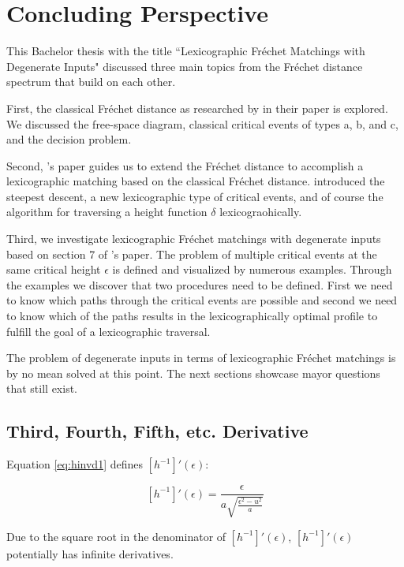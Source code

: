 \section{Concluding Perspective}
	This Bachelor thesis with the title ``Lexicographic Fréchet Matchings with Degenerate Inputs" discussed three main topics from the Fréchet distance spectrum that build on each other.
	
	First, the classical Fréchet distance as researched by \citeauthor{altgodau} in their \citeyear{altgodau} paper \cite{altgodau} is explored. We discussed the free-space diagram, classical critical events of types a, b, and c, and the decision problem.
	
	Second, \citeauthor{rotelex}'s \citeyear{rotelex} paper \cite{rotelex} guides us to extend the Fréchet distance to accomplish a lexicographic matching based on the classical Fréchet distance. \citeauthor{rotelex} introduced the steepest descent, a new lexicographic type of critical events, and of course the algorithm for traversing a height function $\delta$ lexicograohically.
	
	Third, we investigate lexicographic Fréchet matchings with degenerate inputs based on section 7 of \citeauthor{rotelex}'s paper\cite{rotelex}. The problem of multiple critical events at the same critical height $\epsilon$ is defined and visualized by numerous examples. Through the examples we discover that two procedures need to be defined. First we need to know which paths through the critical events are possible and second we need to know which of the paths results in the lexicographically optimal profile to fulfill the goal of a lexicographic traversal.
	
	The problem of degenerate inputs in terms of lexicographic Fréchet matchings is by no mean solved at this point. The next sections showcase mayor questions that still exist.
	
\subsection{Third, Fourth, Fifth, etc. Derivative}

Equation \ref{eq:hinvd1} defines $[h^{-1}]'(\epsilon)$:

$$[h^{-1}]'(\epsilon) = \frac{ \epsilon }{ a\sqrt{\frac{\epsilon^2 - u^2}{a}} }$$

Due to the square root in the denominator of $[h^{-1}]'(\epsilon)$, $[h^{-1}]'(\epsilon)$ potentially has infinite derivatives.

